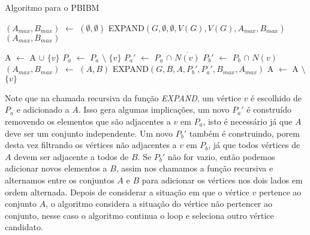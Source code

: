     \begin{algorithm}
        \caption{Algoritmo para o PBIBM}
        \label{alg:algoritmo1}
            \begin{algorithmic}[1]
                    \State $(A_{max}, B_{max})$ $\gets$ $(\emptyset,\emptyset)$
                    \State EXPAND$(G,\emptyset,\emptyset,V(G),V(G),A_{max},B_{max})$
                    \State \Return $(A_{max}, B_{max})$
                \EndFunction
                
                \label{line:expand}
                            \State A $\gets$ A $\cup$ $\{v\}$
                            \State $P_a$ $\gets$ $P_a$ $\setminus$ $\{v\}$
                            \State $P_a'$ $\gets$ $P_a$ $\cap$ $\overline{N(v)}$ \label{line11}
                            \State $P_b'$ $\gets$ $P_b$ $\cap$ $N(v)$
                                \State $(A_{max}, B_{max})$ $\gets$ $(A,B)$
                            \EndIf
                                \State EXPAND$(G,B,A,P_b',P_a',B_{max},A_{max})$
                            \EndIf
                            \State A $\gets$ A $\setminus$ $\{v\}$
                        \EndIf
                    \EndFor
                \EndFunction
                
            \end{algorithmic}
    \end{algorithm}
    
    
Note que na chamada recursiva da função \textit{EXPAND}, um vértice $v$ é escolhido de $P_a$ e adicionado a $A$. Isso gera algumas implicações, um novo $P_a'$ é construído removendo os elementos que são adjacentes a $v$ em $P_a$, isto é necessário já que $A$ deve ser um conjunto independente. Um novo $P_b'$ também é construindo, porem desta vez filtrando os vértices não adjacentes a $v$ em $P_b$, já que todos vértices de $A$ devem ser adjacente a todos de $B$. Se $P_b'$ não for vazio, então podemos adicionar novos elementos a $B$, assim nos chamamos a função recursiva e alternamos entre os conjuntos $A$ e $B$ para adicionar os vértices nos dois lados em ordem alternada. Depois de considerar a situação em que o vértice $v$ pertence ao conjunto $A$, o algoritmo considera a situação do vértice não pertencer ao conjunto, nesse caso o algoritmo continua o loop e seleciona outro vértice candidato.


